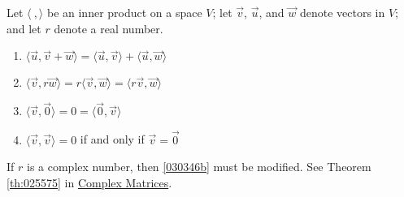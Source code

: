 \documentclass{ximera}
\begin{document}
\begin{theorem}\label{thm:030346}
Let $\langle\ , \rangle$ be an inner product on a space $V$; let $\vec{v}$, $\vec{u}$, and $\vec{w}$ denote vectors in $V$; and let $r$ denote a real number.

\begin{enumerate}
\item\label{030346a} $\langle \vec{u}, \vec{v} + \vec{w}\rangle =
  \langle\vec{u}, \vec{v}\rangle + \langle\vec{u}, \vec{w}\rangle$

\item\label{030346b} $\langle\vec{v}, r\vec{w}\rangle =  r\langle\vec{v}, \vec{w}\rangle = \langle r\vec{v}, \vec{w}\rangle$

\item\label{030346c} $\langle\vec{v}, \vec{0}\rangle = 0 = \langle\vec{0}, \vec{v} \rangle $

\item\label{030346d} $\langle\vec{v}, \vec{v}\rangle = 0$ if and only if $\vec{v} = \vec{0}$

\end{enumerate}
\end{theorem}

\begin{remark}
    If $r$ is a complex number, then \ref{030346b} must be modified.  See Theorem \ref{th:025575} in \href{https://ximera.osu.edu/oerlinalg/LinearAlgebra/RTH-0050/main}{Complex Matrices}.
\end{remark}
\end{document}
